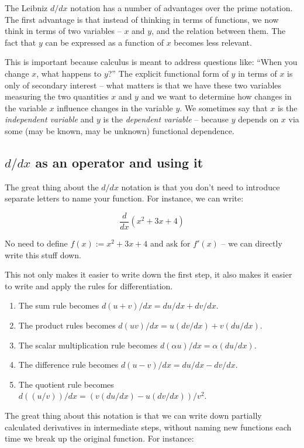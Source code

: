 \documentclass[10pt]{amsart}
\begin{document}
The Leibniz $d/dx$ notation has a number of advantages over the prime
notation. The first advantage is that instead of thinking in terms of
functions, we now think in terms of two variables -- $x$ and $y$, and
the relation between them. The fact that $y$ can be expressed as a
function of $x$ becomes less relevant.

This is important because calculus is meant to address questions like:
``When you change $x$, what happens to $y$?'' The explicit functional
form of $y$ in terms of $x$ is only of secondary interest -- what
matters is that we have these two variables measuring the two
quantities $x$ and $y$ and we want to determine how changes in the
variable $x$ influence changes in the variable $y$. We sometimes say
that $x$ is the {\em independent variable} and $y$ is the {\em
dependent variable} -- because $y$ depends on $x$ via some (may be
known, may be unknown) functional dependence.

\subsection{$d/dx$ as an operator and using it}

The great thing about the $d/dx$ notation is that you don't need to
introduce separate letters to name your function. For instance, we can
write:

$$\frac{d}{dx} (x^2 + 3x + 4)$$

No need to define $f(x) := x^2 + 3x + 4$ and ask for $f'(x)$ -- we can
directly write this stuff down.

This not only makes it easier to write down the first step, it also
makes it easier to write and apply the rules for differentiation.

\begin{enumerate}

\item The sum rule becomes $d(u + v)/dx = du/dx + dv/dx$.
\item The product rules becomes $d(uv)/dx = u(dv/dx) + v(du/dx)$.
\item The scalar multiplication rule becomes $d(\alpha u)/dx = \alpha
(du/dx)$.
\item The difference rule becomes $d(u - v)/dx = du/dx - dv/dx$.
\item The quotient rule becomes $d((u/v))/dx = (v(du/dx) - u(dv/dx))/v^2$.
\end{enumerate}

The great thing about this notation is that we can write down
partially calculated derivatives in intermediate steps, without naming
new functions each time we break up the original function. For instance:
\end{document}

